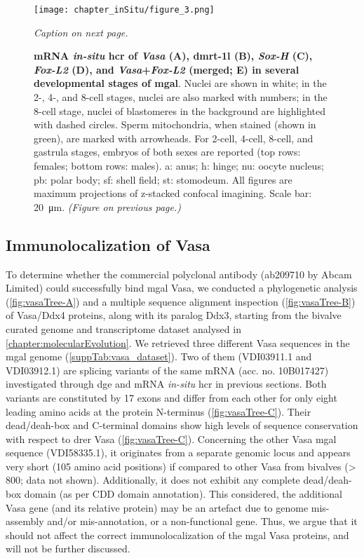 \begin{figure}
	\centering
	\texttt{[image: chapter\_inSitu/figure\_3.png]}
	\caption{\textit{Caption on next page.}}
	\label{fig:hcr}
\end{figure}

\begingroup
\captionsetup[figure]{format=hruleformat}
\begin{figure}\ContinuedFloat
	\caption[]
	{
		\textbf{mRNA \textit{in-situ} \gls{hcr} of \textit{Vasa} (A), \gls{dmrt-1l} (B), \textit{Sox-H} (C), \textit{Fox-L2} (D), and \textit{Vasa}+\textit{Fox-L2} (merged; E) in several developmental stages of \gls{mgal}}. Nuclei are shown in white; in the 2-, 4-, and 8-cell stages, nuclei are also marked with numbers; in the 8-cell stage, nuclei of blastomeres in the background are highlighted with dashed circles. Sperm mitochondria, when stained (shown in green), are marked with arrowheads. For 2-cell, 4-cell, 8-cell, and gastrula stages, embryos of both sexes are reported (top rows: females; bottom rows: males). a: anus; h: hinge; nu: oocyte nucleus; pb: polar body; sf: shell field; st: stomodeum. All figures are maximum projections of z-stacked confocal imagining. Scale bar: \qty{20}{\um}. \textit{(Figure on previous page.)}
	}
\end{figure}
\endgroup

\subsection{Immunolocalization of Vasa}
To determine whether the commercial polyclonal antibody (ab209710 by Abcam Limited) could successfully bind \gls{mgal} Vasa, we conducted a phylogenetic analysis (\cref{fig:vasaTree-A}) and a multiple sequence alignment inspection (\cref{fig:vasaTree-B}) of Vasa/Ddx4 proteins, along with its paralog Ddx3, starting from the bivalve curated genome and transcriptome dataset analysed in \cref{chapter:molecularEvolution}. We retrieved three different Vasa sequences in the \gls{mgal} genome (\cref{suppTab:vasa_dataset}). Two of them (VDI03911.1 and VDI03912.1) are splicing variants of the same mRNA (acc. no. 10B017427) investigated through \gls{dge} and mRNA \textit{in-situ} \gls{hcr} in previous sections. Both variants are constituted by 17 exons and differ from each other for only eight leading amino acids at the protein N-terminus (\cref{fig:vasaTree-C}). Their \gls{dead/deah-box} and C-terminal domains show high levels of sequence conservation with respect to \gls{drer} Vasa (\cref{fig:vasaTree-C}). Concerning the other Vasa \gls{mgal} sequence (VDI58335.1), it originates from a separate genomic locus and appears very short (105 amino acid positions) if compared to other Vasa from bivalves (\num{> 800}; data not shown). Additionally, it does not exhibit any complete \gls{dead/deah-box} domain (as per CDD domain annotation). This considered, the additional Vasa gene (and its relative protein) may be an artefact due to genome mis-assembly and/or mis-annotation, or a non-functional gene. Thus, we argue that it should not affect the correct immunolocalization of the \gls{mgal} Vasa proteins, and will not be further discussed.

